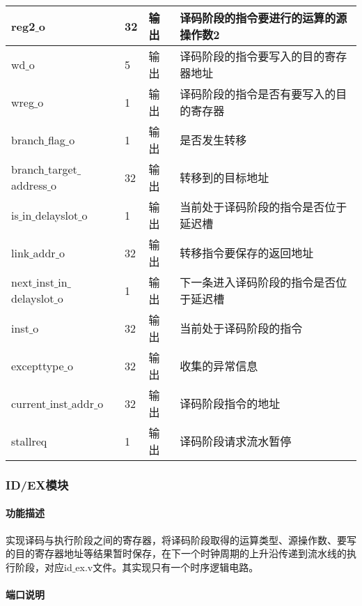 \begin{table}[H]
\begin{tabular}{|l|l|l|l|}
		\hline
		reg2$\_$o & 32 & 输出 & 译码阶段的指令要进行的运算的源操作数2 \\
		\hline
		wd$\_$o & 5 & 输出 & 译码阶段的指令要写入的目的寄存器地址 \\
		\hline
		wreg$\_$o & 1 & 输出 & 译码阶段的指令是否有要写入的目的寄存器 \\
		\hline
		branch$\_$flag$\_$o & 1 & 输出 & 是否发生转移 \\
		\hline
		branch$\_$target$\_$address$\_$o & 32 & 输出 & 转移到的目标地址 \\
		\hline
		is$\_$in$\_$delayslot$\_$o & 1 & 输出 & 当前处于译码阶段的指令是否位于延迟槽 \\
		\hline
		link$\_$addr$\_$o & 32 & 输出 & 转移指令要保存的返回地址 \\
		\hline
		next$\_$inst$\_$in$\_$delayslot$\_$o & 1 & 输出 & 下一条进入译码阶段的指令是否位于延迟槽 \\
		\hline
		inst$\_$o & 32 & 输出 & 当前处于译码阶段的指令 \\
		\hline
		excepttype$\_$o & 32 & 输出 & 收集的异常信息 \\
		\hline
		current$\_$inst$\_$addr$\_$o & 32 & 输出 & 译码阶段指令的地址 \\
		\hline
		stallreq & 1 & 输出 & 译码阶段请求流水暂停 \\
		\hline
	\end{tabular}
\end{table}
\subsubsection{ID/EX模块}
\paragraph{功能描述}
\quad

\quad

实现译码与执行阶段之间的寄存器，将译码阶段取得的运算类型、源操作数、要写的目的寄存器地址等结果暂时保存，在下一个时钟周期的上升沿传递到流水线的执行阶段，对应id$\_$ex.v文件。其实现只有一个时序逻辑电路。
\paragraph{端口说明}
\quad

